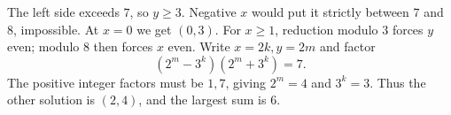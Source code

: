 The left side exceeds $7$, so $y\ge3$. Negative $x$ would put it strictly between $7$ and $8$, impossible. At $x=0$ we get $(0,3)$. For $x\ge1$, reduction modulo $3$ forces $y$ even; modulo $8$ then forces $x$ even. Write $x=2k,y=2m$ and factor
\[
(2^m-3^k)(2^m+3^k)=7.
\]
The positive integer factors must be $1,7$, giving $2^m=4$ and $3^k=3$. Thus the other solution is $(2,4)$, and the largest sum is $\boxed6$.
